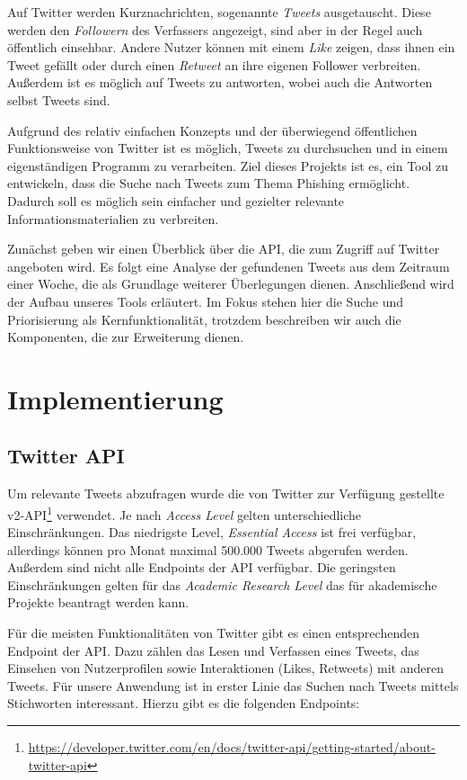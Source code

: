 \documentclass[runningheads]{llncs}
\begin{document}
Auf Twitter werden Kurznachrichten, sogenannte \textit{Tweets} ausgetauscht.
Diese werden den \textit{Followern} des Verfassers angezeigt, sind aber in der Regel auch öffentlich einsehbar.
Andere Nutzer können mit einem \textit{Like} zeigen, dass ihnen ein Tweet gefällt oder durch einen \textit{Retweet} an ihre eigenen Follower verbreiten.
Außerdem ist es möglich auf Tweets zu antworten, wobei auch die Antworten selbst Tweets sind.

Aufgrund des relativ einfachen Konzepts und der überwiegend öffentlichen Funktionsweise von Twitter ist es möglich, Tweets zu durchsuchen und in einem eigenständigen Programm zu verarbeiten.
Ziel dieses Projekts ist es, ein Tool zu entwickeln, dass die Suche nach Tweets zum Thema Phishing ermöglicht.
Dadurch soll es möglich sein einfacher und gezielter relevante Informationsmaterialien zu verbreiten.

Zunächst geben wir einen Überblick über die API, die zum Zugriff auf Twitter angeboten wird.
Es folgt eine Analyse der gefundenen Tweets aus dem Zeitraum einer Woche, die als Grundlage weiterer Überlegungen dienen.
Anschließend wird der Aufbau unseres Tools erläutert.
Im Fokus stehen hier die Suche und Priorisierung als Kernfunktionalität, trotzdem beschreiben wir auch die Komponenten, die zur Erweiterung dienen.

\section{Implementierung}
\subsection{Twitter API}
Um relevante Tweets abzufragen wurde die von Twitter zur Verfügung gestellte v2-API\footnote{\url{https://developer.twitter.com/en/docs/twitter-api/getting-started/about-twitter-api}} verwendet.
Je nach \textit{Access Level} gelten unterschiedliche Einschränkungen.
Das niedrigste Level, \textit{Essential Access} ist frei verfügbar, allerdings können pro Monat maximal 500.000 Tweets abgerufen werden.
Außerdem sind nicht alle Endpoints der API verfügbar.
Die geringsten Einschränkungen gelten für das \textit{Academic Research Level} das für akademische Projekte beantragt werden kann.

Für die meisten Funktionalitäten von Twitter gibt es einen entsprechenden Endpoint der API.
Dazu zählen das Lesen und Verfassen eines Tweets, das Einsehen von Nutzerprofilen sowie Interaktionen (Likes, Retweets) mit anderen Tweets.
Für unsere Anwendung ist in erster Linie das Suchen nach Tweets mittels Stichworten interessant.
Hierzu gibt es die folgenden Endpoints:
\end{document}
